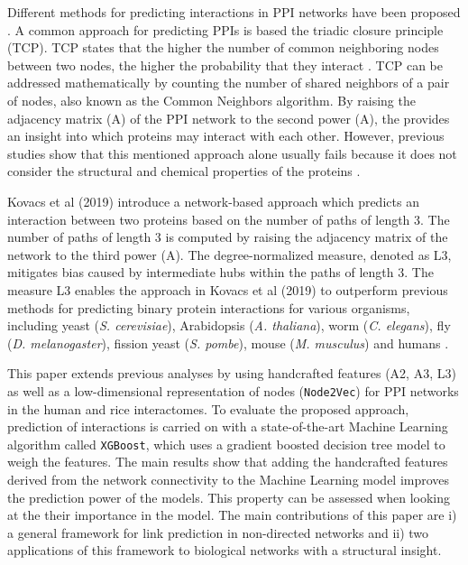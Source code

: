Different methods for predicting interactions in PPI networks have
been proposed \cite{Chang2016PPI,Chen2019PPI,Kotlyar2015PPI}. A 
common approach for predicting PPIs is based the triadic closure principle
(TCP). TCP states that the higher the number of common neighboring
nodes between two nodes, the higher the probability that they interact
\cite{Goldberg2003SmallWorld}. TCP can be addressed mathematically
by counting the number of shared neighbors of a pair of nodes, also
known as the Common Neighbors algorithm. By raising the adjacency
matrix (A) of the PPI network to the second power (A\texttwosuperior ),
the provides an insight into which proteins may interact with each other. However, previous studies
show that this mentioned approach alone usually fails because it does not
consider the structural and chemical properties of the proteins \cite{Cannistraci2013Networks,Kovacs2019}.

Kovacs et al (2019) introduce a network-based approach which predicts
an interaction between two proteins based on the number of paths
of length 3. The number of paths of length 3 is computed by raising
the adjacency matrix of the network to the third power (A\textthreesuperior).
The degree-normalized measure, denoted as L3,  mitigates bias caused by
intermediate hubs within the paths of length 3. The measure L3 enables
the approach in Kovacs et al (2019) to outperform previous methods for predicting
binary protein interactions for various organisms, including yeast (\emph{S. cerevisiae}),
Arabidopsis (\emph{A. thaliana}), worm (\emph{C. elegans}), fly (\emph{D. melanogaster}),
fission yeast (\emph{S. pombe}), mouse (\emph{M. musculus}) and humans
\cite{Kovacs2019}.

This paper extends previous analyses by using handcrafted features (A2,
A3, L3) as well as a low-dimensional representation of nodes 
(\texttt{Node2Vec})\cite{Grover_2016} for PPI networks in the human and rice 
interactomes. To evaluate the proposed approach, prediction of interactions is carried on 
with a state-of-the-art Machine Learning algorithm called \texttt{XGBoost}\cite{2016ChenXGB},
which uses a gradient boosted decision tree model to weigh the features.
The main results show that adding the handcrafted features derived from the
network connectivity to the Machine Learning model improves the prediction
power of the models. This property can be assessed when looking at the their
importance in the model.  The main contributions of this paper are i) a
general framework for link prediction in non-directed networks and ii) two
applications of this framework to biological networks with a structural
insight.


